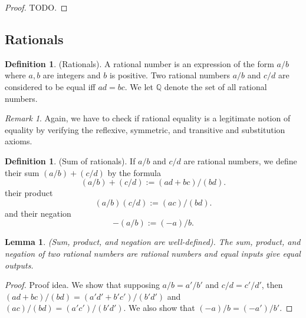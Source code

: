 \documentclass[12pt]{article}
\newtheorem{lemma}[theorem]{Lemma}
\theoremstyle{definition}
\newtheorem{definition}[theorem]{Definition}
\theoremstyle{remark}
\newtheorem*{remark}{Remark}
\begin{document}
\begin{proof}
    TODO.
\end{proof}

\subsection{Rationals}

\begin{definition}
    (Rationals). A rational number is an expression of the form $a/b$ where $a, b$ are integers and $b$ is positive. Two rational numbers $a/b$ and $c/d$ are considered to be equal iff $ad = bc$. We let $\mathbb{Q}$ denote the set of all rational numbers.
\end{definition}

\begin{remark}
    Again, we have to check if rational equality is a legitimate notion of equality by verifying the reflexive, symmetric, and transitive and substitution axioms.
\end{remark}

\begin{definition}
    (Sum of rationals). If $a/b$ and $c/d$ are rational numbers, we define their sum $(a/b) + (c/d)$ by the formula \[
        (a/b) + (c/d) := (ad + bc)/(bd)
    .\]
    their product \[
        (a/b)(c/d) := (ac)/(bd)
    .\]
    and their negation \[
        -(a/b) := (-a)/b
    .\]
\end{definition}

\begin{lemma}
    (Sum, product, and negation are well-defined). The sum, product, and negation of two rational numbers are rational numbers and equal inputs give equal outputs.
\end{lemma}

\begin{proof}
    Proof idea. We show that supposing $a/b = a'/b'$ and $c/d = c'/d'$, then $(ad + bc)/(bd) = (a'd' + b'c')/(b'd')$ and $(ac)/(bd) = (a'c')/(b'd')$. We also show that $(-a)/b = (-a')/b'$.
\end{proof}
\end{document}
